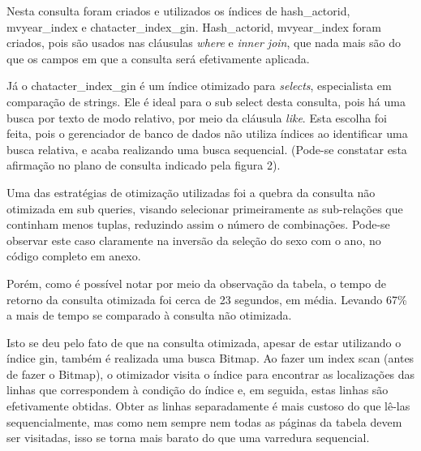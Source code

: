 \documentclass[
	12pt,				%
	oneside,			%
	a4paper,			%
	brazil				%
	]{abntex2}
\begin{document}
Nesta consulta foram criados e utilizados os índices de hash\_actorid, mvyear\_index e chatacter\_index\_gin. Hash\_actorid, mvyear\_index foram criados, pois são usados nas cláusulas \textit{where} e \textit{inner join}, que nada mais são do que os campos em que a consulta será efetivamente aplicada. 

Já o chatacter\_index\_gin é um índice otimizado para \textit{selects}, especialista em comparação de strings. Ele é ideal para o sub select desta consulta, pois há uma busca por texto de modo relativo, por meio da cláusula \textit{like}. Esta escolha foi feita, pois o gerenciador de banco de dados não utiliza índices ao identificar uma busca relativa, e acaba realizando uma busca sequencial. (Pode-se constatar esta afirmação no plano de consulta indicado pela figura 2).

Uma das estratégias de otimização utilizadas foi a quebra da consulta não otimizada em sub queries, visando selecionar primeiramente as sub-relações que continham menos tuplas, reduzindo assim o número de combinações. Pode-se observar este caso claramente na inversão da seleção do sexo com o ano, no código completo em anexo.

Porém, como é possível notar por meio da observação da tabela, o tempo de retorno da consulta otimizada foi cerca de 23 segundos, em média. Levando 67\% a mais de tempo se comparado à consulta não otimizada. 

Isto se deu pelo fato de que na consulta otimizada, apesar de estar utilizando o índice gin, também é realizada uma busca Bitmap. Ao fazer um index scan (antes de fazer o Bitmap), o otimizador visita o índice para encontrar as localizações das linhas que correspondem à condição do índice e, em seguida, estas linhas são efetivamente obtidas. Obter as linhas separadamente é mais custoso do que lê-las sequencialmente, mas como nem sempre nem todas as páginas da tabela devem ser visitadas, isso se torna mais barato do que uma varredura sequencial. 


\newpage
\end{document}
